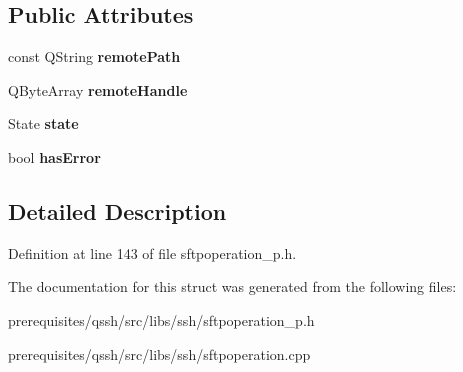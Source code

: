 \subsection*{Public Attributes}
\begin{DoxyCompactItemize}
\item 
\mbox{\label{struct_q_ssh_1_1_internal_1_1_abstract_sftp_operation_with_handle_a48667a77d890e45b06d4f77e595e1e7f}} 
const Q\+String {\bfseries remote\+Path}
\item 
\mbox{\label{struct_q_ssh_1_1_internal_1_1_abstract_sftp_operation_with_handle_a0b398b6b5a9fc3179d2ea32f0673d06c}} 
Q\+Byte\+Array {\bfseries remote\+Handle}
\item 
\mbox{\label{struct_q_ssh_1_1_internal_1_1_abstract_sftp_operation_with_handle_ab1f51c166a6f5f9c7dca2da326976992}} 
State {\bfseries state}
\item 
\mbox{\label{struct_q_ssh_1_1_internal_1_1_abstract_sftp_operation_with_handle_af864c5709e6828f06862a89f8cd51897}} 
bool {\bfseries has\+Error}
\end{DoxyCompactItemize}


\subsection{Detailed Description}


Definition at line 143 of file sftpoperation\+\_\+p.\+h.



The documentation for this struct was generated from the following files\+:\begin{DoxyCompactItemize}
\item 
prerequisites/qssh/src/libs/ssh/sftpoperation\+\_\+p.\+h\item 
prerequisites/qssh/src/libs/ssh/sftpoperation.\+cpp\end{DoxyCompactItemize}
